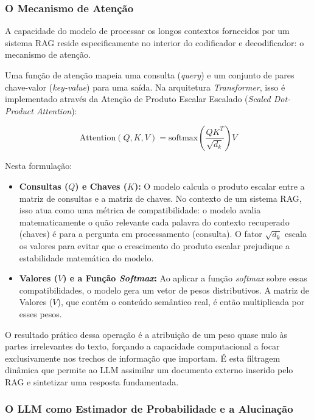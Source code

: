 \subsubsection{O Mecanismo de Atenção}

A capacidade do modelo de processar os longos contextos fornecidos por um sistema RAG reside especificamente no interior do codificador e decodificador: o mecanismo de atenção.

Uma função de atenção mapeia uma consulta (\textit{query}) e um conjunto de pares chave-valor (\textit{key-value}) para uma saída. Na arquitetura \textit{Transformer}, isso é implementado através da Atenção de Produto Escalar Escalado (\textit{Scaled Dot-Product Attention}):

\begin{equation}
  \text{Attention}(Q, K, V) = \text{softmax}\left(\frac{QK^T}{\sqrt{d_k}}\right)V
\end{equation}

Nesta formulação:
\begin{itemize}
  \item \textbf{Consultas ($Q$) e Chaves ($K$):} O modelo calcula o produto escalar entre a matriz de consultas e a matriz de chaves. No contexto de um sistema RAG, isso atua como uma métrica de compatibilidade: o modelo avalia matematicamente o quão relevante cada palavra do contexto recuperado (chaves) é para a pergunta em processamento (consulta). O fator $\sqrt{d_k}$ escala os valores para evitar que o crescimento do produto escalar prejudique a estabilidade matemática do modelo.
  \item \textbf{Valores ($V$) e a Função \textit{Softmax}:} Ao aplicar a função \textit{softmax} sobre essas compatibilidades, o modelo gera um vetor de pesos distributivos. A matriz de Valores ($V$), que contém o conteúdo semântico real, é então multiplicada por esses pesos.
\end{itemize}

O resultado prático dessa operação é a atribuição de um peso quase nulo às partes irrelevantes do texto, forçando a capacidade computacional a focar exclusivamente nos trechos de informação que importam. É esta filtragem dinâmica que permite ao LLM assimilar um documento externo inserido pelo RAG e sintetizar uma resposta fundamentada.

\subsubsection{O LLM como Estimador de Probabilidade e a Alucinação}

